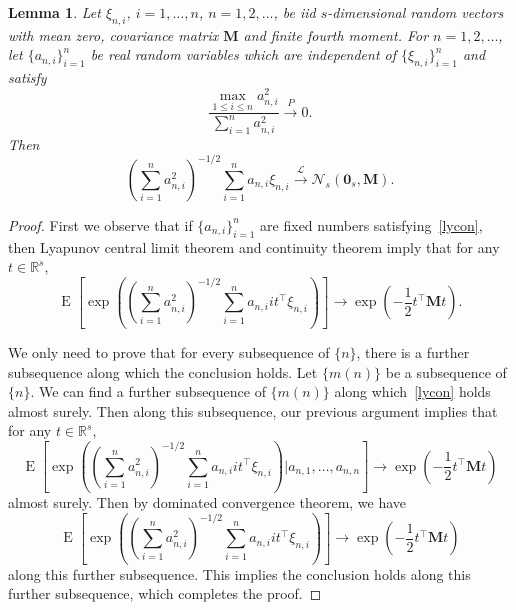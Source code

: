 \documentclass[10pt]{book}
\newtheorem{lemma}{Lemma}
\theoremstyle{definition}
\DeclareMathOperator{\myE}{E}
\newcommand{\bM}{\mathbf{M}}
\begin{document}
\begin{lemma}
    Let $\xi_{n,i}$, $i=1,\ldots, n$, $n=1,2,\ldots$, be iid $s$-dimensional random vectors with mean zero, covariance matrix $\bM$ and finite fourth moment.
    For $n=1,2,\ldots$, let $\{a_{n,i}\}_{i=1}^n$ be real random variables which are independent of $\{\xi_{n,i}\}_{i=1}^n$ and satisfy 
    \begin{equation}\label{lycon}
        \frac{\max_{1\leq i\leq n}a_{n,i}^2}{\sum_{i=1}^n a_{n,i}^2}\xrightarrow{P}0.
    \end{equation}
    Then
    \begin{equation*}
    (\sum_{i=1}^n a_{n,i}^2)^{-1/2}\sum_{i=1}^n a_{n,i}\xi_{n,i} 
    \xrightarrow{\mathcal{L}}\mathcal{N}_s(\mathbf{0}_s,\bM).
    \end{equation*}
    \label{CLTLEMMA}
\end{lemma}
\begin{proof}
    First we observe that if $\{a_{n,i}\}_{i=1}^n$ are fixed numbers satisfying~\eqref{lycon}, then Lyapunov central limit theorem and continuity theorem imply that 
    for any $t\in\mathbb{R}^s$,
    \begin{equation*}
        \myE\left[\exp\left(
    (\sum_{i=1}^n a_{n,i}^2)^{-1/2}\sum_{i=1}^n a_{n,i}it^\top \xi_{n,i} 
    \right)\right]
    \to
    \exp\left(-\frac{1}{2} t^\top \bM t\right).
    \end{equation*}

    We only need to prove that for every subsequence of $\{n\}$, there is a further subsequence along which the conclusion holds.
    Let $\{m(n)\}$  be a subsequence of $\{n\}$.
    We can find a further subsequence of $\{m(n)\}$ along which~\eqref{lycon} holds almost surely.
    Then along this subsequence, our previous argument implies that
    for any $t\in\mathbb{R}^s$,
    \begin{equation*}
        \myE
       \left[ 
        \exp\left(
    (\sum_{i=1}^n a_{n,i}^2)^{-1/2}\sum_{i=1}^n a_{n,i}it^\top \xi_{n,i} 
    \right)
    \bigg| a_{n,1},\ldots, a_{n,n}
\right]
    \to
    \exp\left(-\frac{1}{2} t^\top \bM t\right)
    \end{equation*}
    almost surely.
    Then by dominated convergence theorem, we have
    \begin{equation*}
        \myE
       \left[ 
        \exp\left(
    (\sum_{i=1}^n a_{n,i}^2)^{-1/2}\sum_{i=1}^n a_{n,i}it^\top \xi_{n,i} 
    \right)
\right]
    \to
    \exp\left(-\frac{1}{2} t^\top \bM t\right)
    \end{equation*}
    along this further subsequence. This implies the conclusion holds along this further subsequence, which completes the proof.




 
\end{proof}
\end{document}
